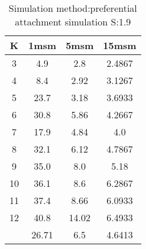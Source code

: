 \begin{table}[H]
\centering
\begin{tabular}{c|ccc}
K &1msm &5msm &15msm\\
\hline
3 & 4.9 & 2.8 & 2.4867\\
4 & 8.4 & 2.92 & 3.1267\\
5 & 23.7 & 3.18 & 3.6933\\
6 & 30.8 & 5.86 & 4.2667\\
7 & 17.9 & 4.84 & 4.0\\
8 & 32.1 & 6.12 & 4.7867\\
9 & 35.0 & 8.0 & 5.18\\
10 & 36.1 & 8.6 & 6.2867\\
11 & 37.4 & 8.66 & 6.0933\\
12 & 40.8 & 14.02 & 6.4933\\
\hline
& 26.71 & 6.5 & 4.6413\\
\end{tabular}
\caption{Simulation method:preferential attachment simulation S:1.9}
\label{tab:s1.9}
\end{table}
